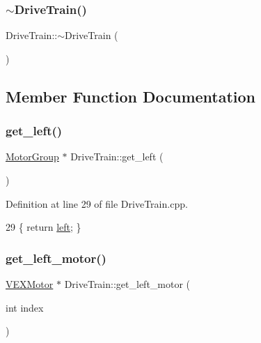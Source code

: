 \subsubsection{\texorpdfstring{$\sim$\+Drive\+Train()}{~DriveTrain()}\hspace{0.1cm}{\footnotesize\ttfamily [2/2]}}
{\footnotesize\ttfamily Drive\+Train\+::$\sim$\+Drive\+Train (\begin{DoxyParamCaption}{ }\end{DoxyParamCaption})}



\subsection{Member Function Documentation}
\mbox{\label{class_drive_train_aebe8b0afce2b9b929d90dfbb9f19e311}} 
\subsubsection{\texorpdfstring{get\+\_\+left()}{get\_left()}}
{\footnotesize\ttfamily \hyperlink{class_motor_group}{Motor\+Group} $\ast$ Drive\+Train\+::get\+\_\+left (\begin{DoxyParamCaption}{ }\end{DoxyParamCaption})}



Definition at line 29 of file Drive\+Train.\+cpp.


\begin{DoxyCode}
29 \{ \textcolor{keywordflow}{return} \hyperlink{class_drive_train_a8343c1e4fad9e5c7e68e627f592e52ea}{left}; \}
\end{DoxyCode}
\mbox{\label{class_drive_train_aee8c9a065107209a264b93a7254ca3ee}} 
\subsubsection{\texorpdfstring{get\+\_\+left\+\_\+motor()}{get\_left\_motor()}}
{\footnotesize\ttfamily \hyperlink{class_v_e_x_motor}{V\+E\+X\+Motor} $\ast$ Drive\+Train\+::get\+\_\+left\+\_\+motor (\begin{DoxyParamCaption}\item[{int}]{index }\end{DoxyParamCaption})}



